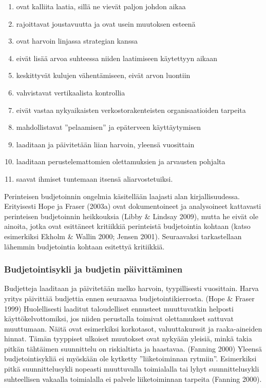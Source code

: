 \documentclass[12pt,a4paper,oneside,pdftex]{report}
\begin{document}
\begin{enumerate}
\setlength{\itemsep}{0pt}
\item ovat kalliita laatia, sillä ne vievät paljon johdon aikaa
\item rajoittavat joustavuutta ja ovat usein muutoksen esteenä
\item ovat harvoin linjassa strategian kanssa
\item eivät lisää arvoa suhteessa niiden laatimiseen käytettyyn aikaan
\item keskittyvät kulujen vähentämiseen, eivät arvon luontiin
\item vahvistavat vertikaalista kontrollia
\item eivät vastaa nykyaikaisten verkostorakenteisten organisaatioiden tarpeita
\item mahdollistavat ”pelaamisen” ja epäterveen käyttäytymisen
\item laaditaan ja päivitetään liian harvoin, yleensä vuosittain
\item laaditaan perustelemattomien olettamuksien ja arvausten pohjalta
\item saavat ihmiset tuntemaan itsensä aliarvostetuiksi.
\end{enumerate}

Perinteisen budjetoinnin ongelmia käsitellään laajasti alan kirjallisuudessa. Erityisesti Hope ja Fraser (2003a) ovat dokumentoineet ja analysoineet kattavasti perinteisen budjetoinnin heikkouksia (Libby & Lindsay 2009), mutta he eivät ole ainoita, jotka ovat esittäneet kritiikkiä perinteistä budjetointia kohtaan (katso esimerkiksi Ekholm & Wallin 2000; Jensen 2001). Seuraavaksi tarkastellaan lähemmin budjetointia kohtaan esitettyä kritiikkiä.

\subsubsection{Budjetointisykli ja budjetin päivittäminen}

Budjetteja laaditaan ja päivitetään melko harvoin, tyypillisesti vuosittain. Harva yritys päivittää budjettia ennen seuraavaa budjetointikierrosta. (Hope & Fraser 1999) Huolellisesti laaditut taloudelliset ennusteet muuttuvatkin helposti käyttökelvottomiksi, jos niiden perustalla toimivat olettamukset sattuvat muuttumaan. Näitä ovat esimerkiksi korkotasot, valuuttakurssit ja raaka-aineiden hinnat. Tämän tyyppiset ulkoiset muutokset ovat nykyään yleisiä, minkä takia pitkän tähtäimen suunnittelu on riskialtista ja haastavaa. (Fanning 2000) Yleensä budjetointisykliä ei myöskään ole kytketty ”liiketoiminnan rytmiin”. Esimerkiksi pitkä suunnittelusykli nopeasti muuttuvalla toimialalla tai lyhyt suunnittelusykli suhteellisen vakaalla toimialalla ei palvele liiketoiminnan tarpeita (Fanning 2000).
\end{document}
